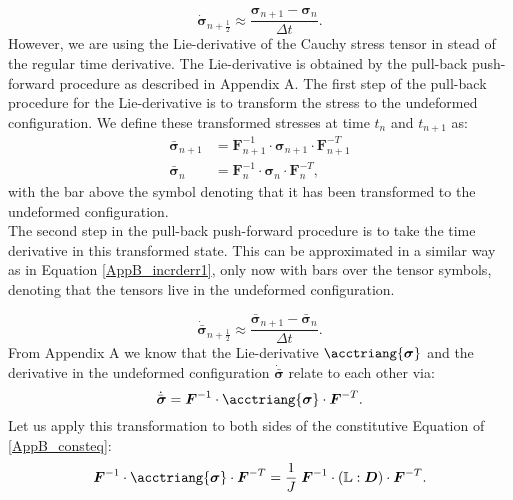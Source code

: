 {\begin{equation}\label{AppB_incrderr1}
\dot{{\boldsymbol{\sigma}}}_{n+\frac{1}{2}}\approx\frac{{\boldsymbol{\sigma}}_{n+1}-{\boldsymbol{\sigma}}_{n}}{\Delta t}.
\end{equation}
However, we are using the Lie-derivative of the Cauchy stress tensor in stead of the regular time derivative. The Lie-derivative is obtained by the pull-back push-forward procedure as described in Appendix A. The first step of the pull-back procedure for the Lie-derivative is to transform the stress to the undeformed configuration. We define these transformed stresses at time $t_n$ and $t_{n+1}$ as:
\begin{equation}
\left.\begin{aligned}
\bar{\boldsymbol{\sigma}}_{n+1} &=\boldsymbol{F}_{n+1}^{-1}\cdot\boldsymbol{\sigma}_{n+1}\cdot\boldsymbol{F}_{n+1}^{-T}\\
\bar{\boldsymbol{\sigma}}_{n} &= \boldsymbol{F}^{-1}_{n}\cdot\boldsymbol{\sigma}_{n}\cdot\boldsymbol{F}_{n}^{-T},
\end{aligned}\right.
\label{Ch3_stressbar}
\end{equation}
with the bar above the symbol denoting that it has been transformed to the undeformed configuration.\\
\newline
The second step in the pull-back push-forward procedure is to take the time derivative in this transformed state. This can be approximated in a similar way as in Equation \ref{AppB_incrderr1}, only now with bars over the tensor symbols, denoting that the tensors live in the undeformed configuration.
{\begin{equation}
\dot{\bar{\boldsymbol{\sigma}}}_{n+\frac{1}{2}}\approx\frac{\bar{\boldsymbol{\sigma}}_{n+1}-\bar{\boldsymbol{\sigma}}_{n}}{\Delta t}.
\end{equation}
From Appendix A we know that the Lie-derivative $\acctriang{\boldsymbol{\sigma}}$ and the derivative in the undeformed configuration $\dot{\bar{\boldsymbol{\sigma}}}$ relate to each other via:
\begin{equation}
 \dot{\bar{\boldsymbol{\sigma}}}=\boldsymbol{F}^{-1}\cdot\acctriang{\boldsymbol{\sigma}}\cdot\boldsymbol{F}^{-T}.
\end{equation}
Let us apply this transformation to both sides of the constitutive Equation of \ref{AppB_consteq}:
\begin{equation}
\boldsymbol{F}^{-1}\cdot\acctriang{\boldsymbol{\sigma}}\cdot\boldsymbol{F}^{-T} = \frac{1}{J}\; \boldsymbol{F}^{-1}\cdot(\boldsymbol{\mathbb L}:\boldsymbol{D})\cdot\boldsymbol{F}^{-T}.
\end{equation} 

}}
